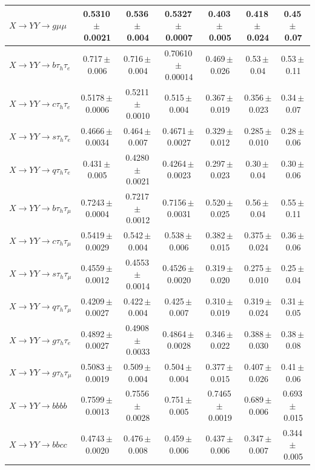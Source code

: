 \begin{landscape}
{\begin{longtable}{@{\extracolsep{\fill}}lcccccc@{}}
$X\to YY\to g\mu\mu$ & 0.5310\,$\pm$\,0.0021 & 0.536\,$\pm$\,0.004 & 0.5327\,$\pm$\,0.0007 & 0.403\,$\pm$\,0.005 & 0.418\,$\pm$\,0.024 & 0.45\,$\pm$\,0.07 \\
\midrule
$X\to YY\to b\tau_h\tau_e$ & 0.717\,$\pm$\,0.006 & 0.716\,$\pm$\,0.004 & 0.70610\,$\pm$\,0.00014 & 0.469\,$\pm$\,0.026 & 0.53\,$\pm$\,0.04 & 0.53\,$\pm$\,0.11 \\
$X\to YY\to c\tau_h\tau_e$ & 0.5178\,$\pm$\,0.0006 & 0.5211\,$\pm$\,0.0010 & 0.515\,$\pm$\,0.004 & 0.367\,$\pm$\,0.019 & 0.356\,$\pm$\,0.023 & 0.34\,$\pm$\,0.07 \\
$X\to YY\to s\tau_h\tau_e$ & 0.4666\,$\pm$\,0.0034 & 0.464\,$\pm$\,0.007 & 0.4671\,$\pm$\,0.0027 & 0.329\,$\pm$\,0.012 & 0.285\,$\pm$\,0.010 & 0.28\,$\pm$\,0.06 \\
$X\to YY\to q\tau_h\tau_e$ & 0.431\,$\pm$\,0.005 & 0.4280\,$\pm$\,0.0021 & 0.4264\,$\pm$\,0.0023 & 0.297\,$\pm$\,0.023 & 0.30\,$\pm$\,0.04 & 0.30\,$\pm$\,0.06 \\
$X\to YY\to b\tau_h\tau_\mu$ & 0.7243\,$\pm$\,0.0004 & 0.7217\,$\pm$\,0.0012 & 0.7156\,$\pm$\,0.0031 & 0.520\,$\pm$\,0.025 & 0.56\,$\pm$\,0.04 & 0.55\,$\pm$\,0.11 \\
$X\to YY\to c\tau_h\tau_\mu$ & 0.5419\,$\pm$\,0.0029 & 0.542\,$\pm$\,0.004 & 0.538\,$\pm$\,0.006 & 0.382\,$\pm$\,0.015 & 0.375\,$\pm$\,0.024 & 0.36\,$\pm$\,0.06 \\
$X\to YY\to s\tau_h\tau_\mu$ & 0.4559\,$\pm$\,0.0012 & 0.4553\,$\pm$\,0.0014 & 0.4526\,$\pm$\,0.0020 & 0.319\,$\pm$\,0.020 & 0.275\,$\pm$\,0.010 & 0.25\,$\pm$\,0.04 \\
$X\to YY\to q\tau_h\tau_\mu$ & 0.4209\,$\pm$\,0.0027 & 0.422\,$\pm$\,0.004 & 0.425\,$\pm$\,0.007 & 0.310\,$\pm$\,0.019 & 0.319\,$\pm$\,0.024 & 0.31\,$\pm$\,0.05 \\
$X\to YY\to g\tau_h\tau_e$ & 0.4892\,$\pm$\,0.0027 & 0.4908\,$\pm$\,0.0033 & 0.4864\,$\pm$\,0.0028 & 0.346\,$\pm$\,0.022 & 0.388\,$\pm$\,0.030 & 0.38\,$\pm$\,0.08 \\
$X\to YY\to g\tau_h\tau_\mu$ & 0.5083\,$\pm$\,0.0019 & 0.509\,$\pm$\,0.004 & 0.504\,$\pm$\,0.004 & 0.377\,$\pm$\,0.015 & 0.407\,$\pm$\,0.026 & 0.41\,$\pm$\,0.06 \\
\midrule
$X\to YY\to bbbb$ & 0.7599\,$\pm$\,0.0013 & 0.7556\,$\pm$\,0.0028 & 0.751\,$\pm$\,0.005 & 0.7465\,$\pm$\,0.0019 & 0.689\,$\pm$\,0.006 & 0.693\,$\pm$\,0.015 \\
$X\to YY\to bbcc$ & 0.4743\,$\pm$\,0.0020 & 0.476\,$\pm$\,0.008 & 0.459\,$\pm$\,0.006 & 0.437\,$\pm$\,0.006 & 0.347\,$\pm$\,0.007 & 0.344\,$\pm$\,0.005 \\

\end{longtable}}
\end{landscape}
